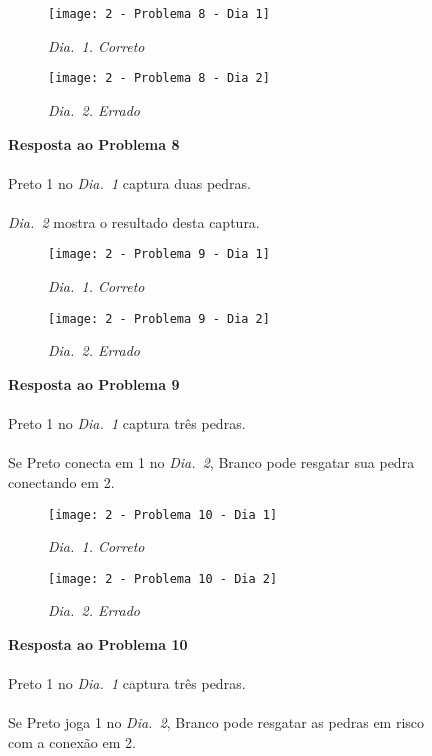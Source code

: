 \vfill

\begin{SCfigure}[][h!]
    \begin{subfigure}[t]{.31\textwidth}
        \texttt{[image: 2 - Problema 8 - Dia 1]}
        \caption*{\emph{Dia.\@~1. Correto}}
    \end{subfigure}
    \hfill
    \begin{subfigure}[t]{.31\textwidth}
        \texttt{[image: 2 - Problema 8 - Dia 2]}
        \caption*{\emph{Dia.\@~2. Errado}}
    \end{subfigure}
    \hfill
    \caption*{\textbf{Resposta ao Problema 8}\\\\Preto 1 no \emph{Dia.\@~1} captura duas pedras.\\\\\emph{Dia.\@~2} mostra o resultado desta captura.}
\end{SCfigure}

\vfill

\begin{SCfigure}[][h!]
    \begin{subfigure}[t]{.31\textwidth}
        \texttt{[image: 2 - Problema 9 - Dia 1]}
        \caption*{\emph{Dia.\@~1. Correto}}
    \end{subfigure}
    \hfill
    \begin{subfigure}[t]{.31\textwidth}
        \texttt{[image: 2 - Problema 9 - Dia 2]}
        \caption*{\emph{Dia.\@~2. Errado}}
    \end{subfigure}
    \hfill
    \caption*{\textbf{Resposta ao Problema 9}\\\\Preto 1 no \emph{Dia.\@~1} captura três pedras.\\\\
    Se Preto conecta em 1 no \emph{Dia.\@~2}, Branco pode resgatar sua pedra conectando em 2.}
\end{SCfigure}

\pagebreak

\begin{SCfigure}[][h!]
    \begin{subfigure}[t]{.31\textwidth}
        \texttt{[image: 2 - Problema 10 - Dia 1]}
        \caption*{\emph{Dia.\@~1. Correto}}
    \end{subfigure}
    \hfill
    \begin{subfigure}[t]{.31\textwidth}
        \texttt{[image: 2 - Problema 10 - Dia 2]}
        \caption*{\emph{Dia.\@~2. Errado}}
    \end{subfigure}
    \hfill
    \caption*{\textbf{Resposta ao Problema 10}\\\\Preto 1 no \emph{Dia.\@~1} captura três pedras.\\\\Se Preto joga 1 no \emph{Dia.\@~2}, Branco pode resgatar as pedras em risco com a conexão em 2.}
\end{SCfigure}

